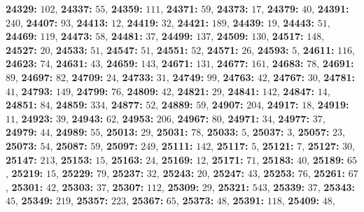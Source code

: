 \textsf{\bfseries 24329:} $102$, \textsf{\bfseries 24337:} $55$, \textsf{\bfseries 24359:} $111$, \textsf{\bfseries 24371:} $59$, \textsf{\bfseries 24373:} $17$, \textsf{\bfseries 24379:} $40$, \textsf{\bfseries 24391:} $240$, \textsf{\bfseries 24407:} $93$, \textsf{\bfseries 24413:} $12$, \textsf{\bfseries 24419:} $32$, \textsf{\bfseries 24421:} $189$, \textsf{\bfseries 24439:} $19$, \textsf{\bfseries 24443:} $51$, \textsf{\bfseries 24469:} $119$, \textsf{\bfseries 24473:} $58$, \textsf{\bfseries 24481:} $37$, \textsf{\bfseries 24499:} $137$, \textsf{\bfseries 24509:} $130$, \textsf{\bfseries 24517:} $148$, \textsf{\bfseries 24527:} $20$, \textsf{\bfseries 24533:} $51$, \textsf{\bfseries 24547:} $51$, \textsf{\bfseries 24551:} $52$, \textsf{\bfseries 24571:} $26$, \textsf{\bfseries 24593:} $5$, \textsf{\bfseries 24611:} $116$, \textsf{\bfseries 24623:} $74$, \textsf{\bfseries 24631:} $43$, \textsf{\bfseries 24659:} $143$, \textsf{\bfseries 24671:} $131$, \textsf{\bfseries 24677:} $161$, \textsf{\bfseries 24683:} $78$, \textsf{\bfseries 24691:} $89$, \textsf{\bfseries 24697:} $82$, \textsf{\bfseries 24709:} $24$, \textsf{\bfseries 24733:} $31$, \textsf{\bfseries 24749:} $99$, \textsf{\bfseries 24763:} $42$, \textsf{\bfseries 24767:} $30$, \textsf{\bfseries 24781:} $41$, \textsf{\bfseries 24793:} $149$, \textsf{\bfseries 24799:} $76$, \textsf{\bfseries 24809:} $42$, \textsf{\bfseries 24821:} $29$, \textsf{\bfseries 24841:} $142$, \textsf{\bfseries 24847:} $14$, \textsf{\bfseries 24851:} $84$, \textsf{\bfseries 24859:} $334$, \textsf{\bfseries 24877:} $52$, \textsf{\bfseries 24889:} $59$, \textsf{\bfseries 24907:} $204$, \textsf{\bfseries 24917:} $18$, \textsf{\bfseries 24919:} $11$, \textsf{\bfseries 24923:} $39$, \textsf{\bfseries 24943:} $62$, \textsf{\bfseries 24953:} $206$, \textsf{\bfseries 24967:} $80$, \textsf{\bfseries 24971:} $34$, \textsf{\bfseries 24977:} $37$, \textsf{\bfseries 24979:} $44$, \textsf{\bfseries 24989:} $55$, \textsf{\bfseries 25013:} $29$, \textsf{\bfseries 25031:} $78$, \textsf{\bfseries 25033:} $5$, \textsf{\bfseries 25037:} $3$, \textsf{\bfseries 25057:} $23$, \textsf{\bfseries 25073:} $54$, \textsf{\bfseries 25087:} $59$, \textsf{\bfseries 25097:} $249$, \textsf{\bfseries 25111:} $142$, \textsf{\bfseries 25117:} $5$, \textsf{\bfseries 25121:} $7$, \textsf{\bfseries 25127:} $30$, \textsf{\bfseries 25147:} $213$, \textsf{\bfseries 25153:} $15$, \textsf{\bfseries 25163:} $24$, \textsf{\bfseries 25169:} $12$, \textsf{\bfseries 25171:} $71$, \textsf{\bfseries 25183:} $40$, \textsf{\bfseries 25189:} $65$, \textsf{\bfseries 25219:} $15$, \textsf{\bfseries 25229:} $79$, \textsf{\bfseries 25237:} $32$, \textsf{\bfseries 25243:} $20$, \textsf{\bfseries 25247:} $43$, \textsf{\bfseries 25253:} $76$, \textsf{\bfseries 25261:} $67$, \textsf{\bfseries 25301:} $42$, \textsf{\bfseries 25303:} $37$, \textsf{\bfseries 25307:} $112$, \textsf{\bfseries 25309:} $29$, \textsf{\bfseries 25321:} $543$, \textsf{\bfseries 25339:} $37$, \textsf{\bfseries 25343:} $45$, \textsf{\bfseries 25349:} $219$, \textsf{\bfseries 25357:} $223$, \textsf{\bfseries 25367:} $65$, \textsf{\bfseries 25373:} $48$, \textsf{\bfseries 25391:} $118$, \textsf{\bfseries 25409:} $48$, 
